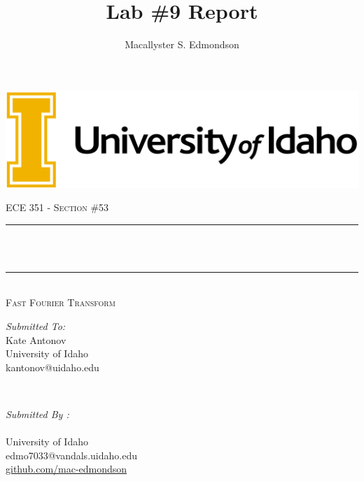 \documentclass[12pt]{report}
\title{Lab \#9 Report}
\author{Macallyster S. Edmondson}
\date{\longdate\displaydate{date}}
\makeatletter
\let\thetitle\@title
\let\theauthor\@author
\makeatother
\begin{document}
\begin{titlepage}\thispagestyle{titlepage}
\centering
\includegraphics[scale = 0.12]{univ-logo.png}\\[1.0 cm]
\begin{center}    \textsc{\Large   ECE 351 - Section \#53 }\\[2.0 cm]
\end{center}%

\rule{\linewidth}{0.2 mm} \\[0.4 cm]
{ \huge \bfseries \thetitle}\\
\rule{\linewidth}{0.2 mm} \\[0.5 cm]
\textsc{\Large Fast Fourier Transform }\\[1.5 cm] %
\begin{minipage}{0.4\textwidth}
\begin{flushleft} \large
\emph{Submitted To:}\\
Kate Antonov\\ \small
University of Idaho\\
kantonov@uidaho.edu\\
\hfill
\end{flushleft}
\end{minipage}~
\begin{minipage}{0.4\textwidth}
\begin{flushright} \large
\emph{Submitted By :} \\
\theauthor \\ \small
University of Idaho\\
edmo7033@vandals.uidaho.edu\\
\href{http://github.com/mac-edmondson}{github.com/mac-edmondson}\\
\end{flushright}
\end{minipage}\\[2 cm]
\vfill
\end{titlepage}
\tableofcontents\thispagestyle{customplain}
\pagebreak
\renewcommand{\thesection}{\arabic{section}}
\end{document}
